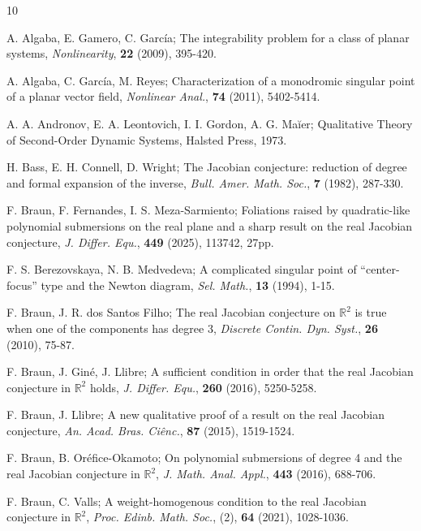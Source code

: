 \documentclass[reqno]{amsart}
\begin{document}
\begin{thebibliography}{10}

A. Algaba, E. Gamero, C. Garc\'ia;
The integrability problem for a class of planar systems,
\emph{Nonlinearity}, \textbf{22} (2009), 395-420.

A. Algaba, C. Garc\'ia, M. Reyes;
Characterization of a monodromic singular point of a planar vector field,
\emph{Nonlinear Anal.}, \textbf{74} (2011), 5402-5414.

A. A. Andronov, E. A. Leontovich, I. I. Gordon, A. G. Ma\u{i}er;
Qualitative Theory of Second-Order Dynamic Systems, Halsted Press, 1973.

H. Bass, E. H. Connell, D. Wright;
The Jacobian conjecture: reduction of degree and formal expansion of the inverse,
\emph{Bull. Amer. Math. Soc.}, \textbf{7} (1982), 287-330.

F. Braun, F. Fernandes, I. S. Meza-Sarmiento;
Foliations raised by quadratic-like polynomial submersions on the real plane and a sharp result on the real Jacobian conjecture,
\emph{J. Differ. Equ.}, \textbf{449} (2025), 113742, 27pp.

F. S. Berezovskaya, N. B. Medvedeva;
A complicated singular point of “center-focus” type and the Newton diagram,
\emph{Sel. Math.}, \textbf{13} (1994), 1-15.

F. Braun, J. R. dos Santos Filho;
The real Jacobian conjecture on $\mathbb{R}^2$ is true when one of the components has degree 3,
\emph{Discrete Contin. Dyn. Syst.}, \textbf{26} (2010), 75-87.

F. Braun, J. Gin\'{e}, J. Llibre;
A sufficient condition in order that the real Jacobian conjecture in $\mathbb{R}^2$ holds,
\emph{J. Differ. Equ.}, \textbf{260} (2016), 5250-5258.

F. Braun, J. Llibre;
A new qualitative proof of a result on the real Jacobian conjecture,
\emph{An. Acad. Bras. Ci\^{e}nc.}, \textbf{87} (2015), 1519-1524.

F. Braun, B. Or\'{e}fice-Okamoto;
On polynomial submersions of degree 4 and the real Jacobian conjecture in $\mathbb{R}^2$,
\emph{J. Math. Anal. Appl.}, \textbf{443} (2016), 688-706.

F. Braun, C. Valls;
A weight-homogenous condition to the real Jacobian conjecture in $\mathbb{R}^2$,
\emph{Proc. Edinb. Math. Soc.}, (2), \textbf{64} (2021), 1028-1036.


\end{thebibliography}
\end{document}

